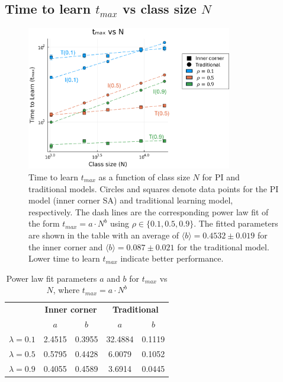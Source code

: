 \newpage

\subsection{Time to learn $t_{max}$ vs class size $N$} \label{subsec: 2DBPCA tmax vs N}
\begin{figure}[h!]
    \centering
    \includegraphics[width=0.8\textwidth]{figures/2D-BPCA-analysis/N_vs_tmax-traditional-inner_corner.png}
    \caption[Class size dependence of time to learn in homogenous models]{Time to learn $t_{max}$ as a function of class size $N$ for PI and traditional models. 
    Circles and squares denote data points for the PI model (inner corner SA) and traditional learning model, respectively. 
    The dash lines are the corresponding power law fit of the form $t_{max}=a \cdot N^b$ using $\rho \in \lbrace 0.1, 0.5, 0.9 \rbrace$. 
    The fitted parameters are shown in the table with an average of $\langle b \rangle = 0.4532 \pm 0.019$ for the inner corner and $\langle b \rangle = 0.087\pm0.021$ for the traditional model.
    Lower time to learn $t_{max}$ indicate better performance.
    }
    \label{fig:Traditional vs PI tmax vs N}
\end{figure}

\begin{table}[htbp!]
  \centering
  
  \begin{tabular}{|c|cc|cc|}
    \hline
    & \multicolumn{2}{c|}{\textbf{Inner corner}}       & \multicolumn{2}{c|}{\textbf{Traditional}}        \\ \cline{2-5} 
    & \multicolumn{1}{c|}{\textbf{$a$}} & \textbf{$b$} & \multicolumn{1}{c|}{\textbf{$a$}} & \textbf{$b$} \\ \hline
    \textbf{$\lambda=0.1$} & \multicolumn{1}{c|}{2.4515}       & 0.3955       & \multicolumn{1}{c|}{32.4884}      & 0.1119       \\ \hline
    \textbf{$\lambda=0.5$} & \multicolumn{1}{c|}{0.5795}       & 0.4428       & \multicolumn{1}{c|}{6.0079}       & 0.1052       \\ \hline
    \textbf{$\lambda=0.9$} & \multicolumn{1}{c|}{0.4055}       & 0.4589       & \multicolumn{1}{c|}{3.6914}       & 0.0445       \\ \hline
  \end{tabular}
  \caption{Power law fit parameters $a$ and $b$ for $t_{max}$ vs $N$, where $t_{max}=a \cdot N ^ b$}
  \label{tab:2DBPCA tmax vs N fit params}
\end{table}

